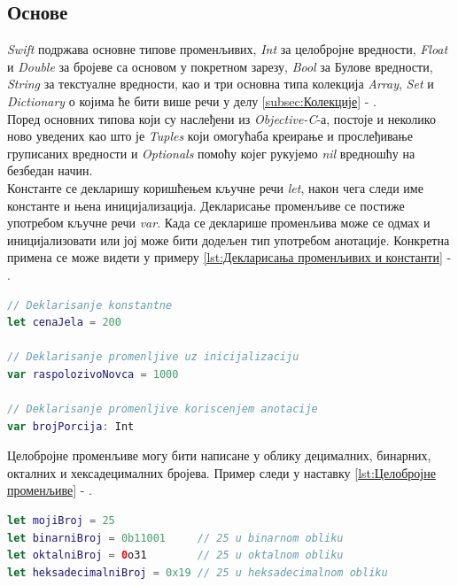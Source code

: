 \documentclass[12pt,oneside]{memoir}
\begin{document}
\subsection{Основе}

\indent \textit{Swift} подржава основне типове променљивих, \textit{Int} за целобројне вредности, \textit{Float} и \textit{Double} за бројеве са основом у покретном зарезу, \textit{Bool} за Булове вредности, \textit{String} за текстуалне вредности, као и три основна типа колекција \textit{Array}, \textit{Set} и \textit{Dictionary} о којима ће бити више речи у делу \ref{subsec:Колекције} - . 
\\ 
\indent Поред основних типова који су наслеђени из \textit{Objective-C}-а, постоје и неколико ново уведених као што је \textit{Tuples} који омогућаба креирање и прослеђивање груписаних вредности и \textit{Optionals} помоћу којег рукујемо \textit{nil} вредношћу на безбедан начин.
\\
\indent Константе се декларишу коришћењем кључне речи \textit{let}, након чега следи име константе и њена иницијализација. Декларисање променљиве се постиже употребом кључне речи \textit{var}. Када се декларише променљива може се одмах и иницијализовати или јој може бити додељен тип употребом анотације. Конкретна примена се може видети у примеру \ref{lst:Декларисања променљивих и константи} - .

\begin{lstlisting}[caption=\textit{{Декларисања променљивих и константи}}, label={lst:Декларисања променљивих и константи}, language=Swift, frame=single]
// Deklarisanje konstantne
let cenaJela = 200

// Deklarisanje promenljive uz inicijalizaciju
var raspolozivoNovca = 1000

// Deklarisanje promenljive koriscenjem anotacije
var brojPorcija: Int
\end{lstlisting}

\indent Целобројне променљиве могу бити написане у облику децималних, бинарних, окталних и хексадецималних бројева. Пример следи у наставку \ref{lst:Целобројне променљиве} - .

\begin{lstlisting}[caption=\textit{{Целобројне променљиве}}, label={lst:Целобројне променљиве}, language=Swift, frame=single]
let mojiBroj = 25 
let binarniBroj = 0b11001     // 25 u binarnom obliku
let oktalniBroj = 0o31        // 25 u oktalnom obliku
let heksadecimalniBroj = 0x19 // 25 u heksadecimalnom obliku
\end{lstlisting}
\end{document}
